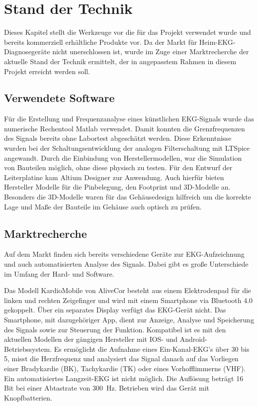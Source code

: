 
\section{Stand der Technik}

Dieses Kapitel stellt die Werkzeuge vor die für das Projekt verwendet wurde und bereits kommerziell erhältliche Produkte vor. Da der Markt für Heim-EKG-Diagnosegeräte nicht unerschlossen ist, wurde im Zuge einer Marktrecherche der aktuelle Stand der Technik ermittelt, der in angepasstem Rahmen in diesem Projekt erreicht werden soll. 

\subsection{Verwendete Software}

Für die Erstellung und Frequenzanalyse eines künstlichen EKG-Signals wurde das numerische Rechentool Matlab verwendet. Damit konnten die Grenzfrequenzen des Signals bereits ohne Labortest abgeschätzt werden. Diese Erkenntnisse wurden bei der Schaltungsentwicklung der analogen Filterschaltung mit LTSpice angewandt. Durch die Einbindung von Herstellermodellen, war die Simulation von Bauteilen möglich, ohne diese physisch zu testen. Für den Entwurf der Leiterplatine kam Altium Designer zur Anwendung. Auch hierfür bieten Hersteller Modelle für die Pinbelegung, den Footprint und 3D-Modelle an. Besonders die 3D-Modelle waren für das Gehäusedesign hilfreich um die korrekte Lage und Maße der Bauteile im Gehäuse auch optisch zu prüfen.

\subsection{Marktrecherche}

Auf dem Markt finden sich bereits verschiedene Geräte zur EKG-Aufzeichnung und auch automatisierten Analyse des Signals. Dabei gibt es große Unterschiede im Umfang der Hard- und Software.

Das Modell KardioMobile von AliveCor besteht aus einem Elektrodenpad für die linken und rechten Zeigefinger und wird mit einem Smartphone via Bluetooth 4.0 gekoppelt. Über ein separates Display verfügt das EKG-Gerät nicht. Das Smartphone, mit dazugehöriger App, dient zur Anzeige, Analyse und Speicherung des Signals sowie zur Steuerung der Funktion. Kompatibel ist es mit den aktuellen Modellen der gängigen Hersteller mit IOS- und Android-Betriebssystem. Es ermöglicht die Aufnahme eines Ein-Kanal-EKG's über \SI{30}{\sec} bis \SI{5}{\min}, misst die Herzfrequenz und analysiert das Signal danach auf das Vorliegen einer Bradykardie (BK), Tachykardie (TK) oder eines Vorhofflimmerns (VHF). Ein automatisiertes Langzeit-EKG ist nicht möglich. Die Auflösung beträgt 16 Bit bei einer Abtastrate von \SI{300}{\hertz}. Betrieben wird das Gerät mit Knopfbatterien.

